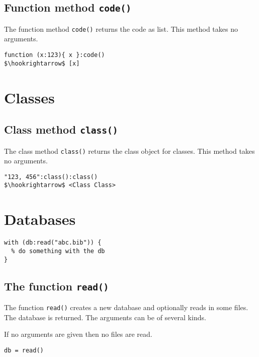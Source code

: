 \documentclass[11pt,a4paper]{scrbook}
\newcommand\function[1]{\texttt{#1}}
\newcommand\method[1]{\texttt{#1}}
\begin{document}
\subsection{Function method \method{code()}}

The function method \method{code()} returns the code as list. This method
takes no arguments.

\begin{lstlisting}[language=BibTool,mathescape=true]
function (x:123){ x }:code()
$\hookrightarrow$ [x]
\end{lstlisting}


\section{Classes}\label{sec:classes}


\subsection{Class method \method{class()}}

The class method \method{class()} returns the class object for classes. This
method takes no arguments.

\begin{lstlisting}[language=BibTool,mathescape=true]
"123, 456":class():class()
$\hookrightarrow$ <Class Class>
\end{lstlisting}


\section{Databases}

\begin{lstlisting}[language=BibTool,mathescape=true]
with (db:read("abc.bib")) {
  % do something with the db
}
\end{lstlisting}

\subsection{The function \function{read()}}\label{db:read}

The function \function{read()} creates a new database and optionally reads in
some files. The database is returned. The arguments can be of several kinds.

If no arguments are given then no files are read.

\begin{lstlisting}[language=BibTool,mathescape=true]
db = read()
\end{lstlisting}
\end{document}
